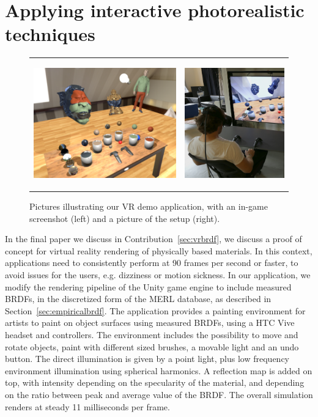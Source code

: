 \section{Applying interactive photorealistic techniques}
\label{sec:vrbrfcontribution}
\begin{figure}[t]
\centering
\begin{tabular}{@{}c@{}c@{}}
	 \includegraphics[height = 5.5cm]{figures/screen1_crop} &
		 \includegraphics[height = 5.5cm]{figures/person} \\[-2.5ex]
\end{tabular}
  \caption{Pictures illustrating our VR demo application, with an in-game screenshot (left) and a picture of the setup (right). }
  \label{fig:vrbrdfimage}
\end{figure}
In the final paper we discuss in Contribution~\ref{sec:vrbrdf}, we discuss a proof of concept for virtual reality rendering of physically based materials. In this context, applications need to consistently perform at 90 frames per second or faster, to avoid issues for the users, e.g. dizziness or motion sickness. In our application, we modify the rendering pipeline of the Unity game engine to include measured BRDFs, in the discretized form of the MERL database, as described in Section~\ref{sec:empiricalbrdf}. The application provides a painting environment for artists to paint on object surfaces using measured BRDFs, using a HTC Vive headset and controllers. The environment includes the possibility to move and rotate objects, paint with different sized brushes, a movable light and an undo button. The direct illumination is given by a point light, plus low frequency environment illumination using spherical harmonics. A reflection map is added on top, with intensity depending on the specularity of the material, and depending on the ratio between peak and average value of the BRDF. The overall simulation renders at steady 11 milliseconds per frame.

